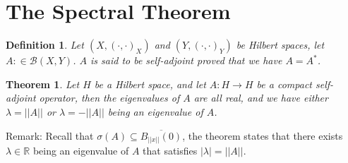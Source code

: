 \documentclass[11pt]{book}
\theoremstyle{break}
\theoremstyle{break}
\newtheorem{thm}{Theorem}[section]
\newtheorem{defn}{Definition}[corL]
\newcommand{\R}{\mathbb{R}}
\newcommand{\remark}{\color{blue}Remark: \color{black}}
\begin{document}
\newpage
\section[The Spectral Theorem]{\color{red}The Spectral Theorem\color{black}}
\begin{defn}
Let $(X,(\cdot,\cdot)_X)$ and $(Y,(\cdot,\cdot)_Y)$ be Hilbert spaces, let $A:\in \mathcal{B}(X,Y)$. $A$ is said to be self-adjoint proved that we have $A = A^*$. 
\end{defn}


\begin{thm}
Let $H$ be a Hilbert space, and let $A:H \to H$ be a compact self-adjoint operator, then the eigenvalues of $A$ are all real, and we have either $\lambda = ||A||$ or $\lambda = -||A||$ being an eigenvalue of $A$. 
\end{thm}
\remark Recall that $\sigma(A)\subseteq \overline{B_{||x||}(0)}$, the theorem states that there exists $\lambda \in \R$ being an eigenvalue of $A$ that satisfies $|\lambda| = ||A||$. 
\end{document}
